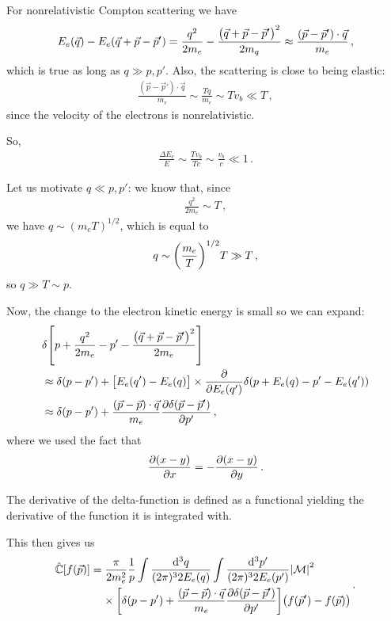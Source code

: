 \documentclass[main.tex]{subfiles}
\begin{document}
For nonrelativistic Compton scattering we have 
%
\begin{align}
E_e(\vec{q}) - E_e (\vec{q} + \vec{p} - \vec{p}')
 = \frac{q^2}{2 m_e} - \frac{\qty(\vec{q} + \vec{p} - \vec{p}')^2}{2m_q}
 \approx \frac{(\vec{p} - \vec{p}') \cdot \vec{q}}{m_e}
\,,
\end{align}
%
which is true as long as \(q \gg p, p'\). 
Also, the scattering is close to being elastic: 
%
\begin{align}
  \frac{(\vec{p} - \vec{p}') \cdot \vec{q}}{m_e}
  \sim \frac{Tq}{m_e} \sim T v_b \ll T
\,,
\end{align}
%
since the velocity of the electrons is nonrelativistic. 

So, 
%
\begin{align}
\frac{\Delta E_e}{E} \sim \frac{T v_b}{T c} \sim \frac{v_b}{c} \ll 1
\,.
\end{align}

Let us motivate \(q \ll p, p'\): we know that, since 
%
\begin{align}
\frac{q^2}{2m_e} \sim T
\,,
\end{align}
%
we have \(q \sim (m_e T)^{1/2} \), which is equal to 
%
\begin{align}
q \sim \qty(\frac{m_e}{T})^{1/2} T \gg T 
\,,
\end{align}
%
so \(q \gg T \sim p\). 

Now, the change to the electron kinetic energy is small so we can expand: 
%
\begin{subequations}
\begin{align}
&\delta \qty[p + \frac{q^2}{2m_e} - p' - \frac{\qty(\vec{q} + \vec{p} -\vec{p}')^2}{2m_e} ]   \\
&\approx
\delta (p - p')
 + \qty[E_e (q') - E_e (q)]
 \times \pdv{}{E_e(q')} \delta (p + E_e (q) - p' - E_e(q'))  \\
 &\approx 
\delta (p - p')
+ \frac{(\vec{p}- \vec{p}) \cdot \vec{q}}{m_e} 
\pdv{ \delta (\vec{p} - \vec{p}')}{p'} 
\,,
\end{align}
\end{subequations}
%
where we used the fact that 
%
\begin{align}
\pdv{(x-y)}{x} = - \pdv{(x-y)}{y}
\,.
\end{align}

The derivative of the delta-function is defined as a functional yielding the derivative of the function it is integrated with. 

This then gives us 
%
\begin{subequations}
\begin{align}
\begin{split}
\hat{\mathbb{C}} [f(\vec{p})] &= \frac{\pi}{2 m_e^2}
\frac{1}{p} 
\int \frac{ \dd[3]{q}}{(2\pi)^3 2 E_e (q)}
\int \frac{ \dd[3]{p'}}{(2\pi)^3 2 E_e (p')} 
\abs{\mathcal{M}}^2 \\
&\phantom{=}\ 
\times\qty[\delta (p - p') + \frac{(\vec{p}- \vec{p}) \cdot \vec{q}}{m_e} 
\pdv{ \delta (\vec{p} - \vec{p}')}{p'} 
] \qty(f (\vec{p}') - f(\vec{p})) 
\end{split}
\,.
\end{align}
\end{subequations}
\end{document}

